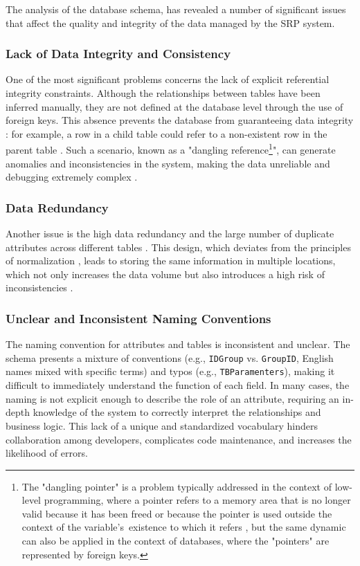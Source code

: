 The analysis of the database schema, has revealed a number of significant issues that affect the quality and integrity of the data managed by the SRP system.

\subsubsection{Lack of Data Integrity and Consistency}
One of the most significant problems concerns the lack of explicit referential integrity constraints. Although the relationships between tables have been inferred manually, they are not defined at the database level through the use of foreign keys. This absence prevents the database from guaranteeing data integrity \cite{referential_integrity_important_databases}: for example, a row in a child table could refer to a non-existent row in the parent table \cite{referential_integrity_y42}. Such a scenario, known as a "dangling reference\footnote{The "dangling pointer" is a problem typically addressed in the context of low-level programming, where a pointer refers to a memory area that is no longer valid because it has been freed or because the pointer is used outside the context of the variable's~existence to which it refers \cite{apogeo-fondamenti-programmazione}, but the same dynamic can also be applied in the context of databases, where the "pointers" are represented by foreign keys.}", can generate anomalies and inconsistencies in the system, making the data unreliable and debugging extremely complex \cite{referential_integrity_important_databases}.

\subsubsection{Data Redundancy}
Another issue is the high data redundancy and the large number of duplicate attributes across different tables \cite{srp_windowsservice_git}. This design, which deviates from the principles of normalization \cite{technical_debt_is_database_normalization}, leads to storing the same information in multiple locations, which not only increases the data volume but also introduces a high risk of inconsistencies \cite{technical_debt_is_database_normalization}.

\subsubsection{Unclear and Inconsistent Naming Conventions}
The naming convention for attributes and tables is inconsistent and unclear. The schema presents a mixture of conventions (e.g., \texttt{IDGroup} vs. \texttt{GroupID}, English names mixed with specific terms) and typos (e.g., \texttt{TBParamenters}), making it difficult to immediately understand the function of each field. In many cases, the naming is not explicit enough to describe the role of an attribute, requiring an in-depth knowledge of the system to correctly interpret the relationships and business logic. This lack of a unique and standardized vocabulary hinders collaboration among developers, complicates code maintenance, and increases the likelihood of errors.


